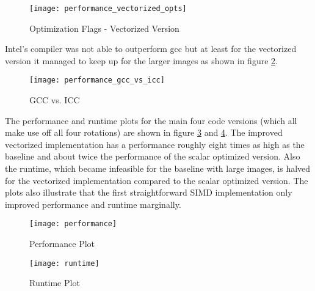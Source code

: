 \begin{figure}[H]
  \texttt{[image: performance\_vectorized\_opts]}
  \caption{Optimization Flags - Vectorized Version}
  \label{fig:perf_vec}
\end{figure}

Intel's compiler was not able to outperform gcc but at least for the vectorized
version it managed to keep up for the larger images as shown in figure
\ref{fig:perf_gcc_vs_icc}.

\begin{figure}[H]
  \texttt{[image: performance\_gcc\_vs\_icc]}
  \caption{GCC vs. ICC}
  \label{fig:perf_gcc_vs_icc}
\end{figure}

 The performance and runtime plots for the main four code
versions (which all make use off all four rotations) are shown in figure
\ref{fig:perf} and \ref{fig:runtime}. The improved vectorized implementation has
a performance roughly eight times as high as the baseline and about twice the
performance of the scalar optimized version. Also the runtime, which became
infeasible for the baseline with large images, is halved for the vectorized
implementation compared to the scalar optimized version. The plots also
illustrate that the first straightforward SIMD implementation only improved
performance and runtime marginally.

\begin{figure}[!ht]
  \texttt{[image: performance]}
  \caption{Performance Plot}
  \label{fig:perf}
\end{figure}


\begin{figure}[!ht]
  \texttt{[image: runtime]}
  \caption{Runtime Plot}
  \label{fig:runtime}
\end{figure}






